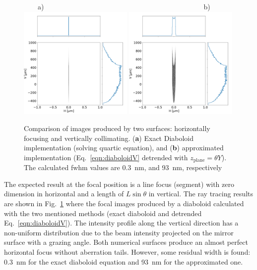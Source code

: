 \documentclass{iucr}       %
\begin{document}
\begin{figure}\label{fig:pointToSegment}
\flushleft
~~~~a)~~~~~~~~~~~~~~~~~~~~~~~~~~~~~~~~~~~~~~~~~~~~~~b)\\
\centering
\includegraphics[width=0.49\textwidth]{figures/p2s_V_z.png}
\includegraphics[width=0.49\textwidth]{figures/p2s_K_z.png} \\
\flushleft
\caption{Comparison of images produced by two surfaces: horizontally focusing and vertically collimating. (\textbf{a}) Exact Diaboloid implementation (solving quartic equation), and (\textbf{b}) approximated implementation (Eq.~\ref{eqn:diaboloidV} detrended with $z_\mathrm{plane}=\theta Y$). The calculated fwhm values are 0.3~nm, and 93~nm, respectively
}
\end{figure}

The expected result at the focal position is a line focus (segment) with zero dimension in horizontal and a length of $L\sin\theta$ in vertical. The ray tracing results are shown in Fig.~\ref{fig:pointToSegment} where the focal images produced by a diaboloid calculated with the two mentioned methods (exact diaboloid and detrended Eq.~\ref{eqn:diaboloidV}). The intensity profile along the vertical direction has a non-uniform distribution due to the beam intensity projected on the mirror surface with a grazing angle.
Both numerical surfaces produce an almost perfect horizontal focus without aberration tails. However, some residual width is found: \SI{0.3}{\nano\meter} for the exact diaboloid equation and \SI{93}{\nano\meter} for the approximated one. 
\end{document}
